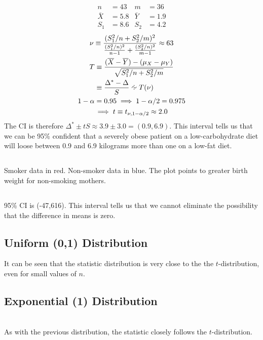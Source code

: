 \documentclass[twocolumn]{article}
\begin{document}
\begin{align*}
n&=43		&	m&=36\\
\bar X&=5.8	&	\bar Y&=1.9\\
S_1&=8.6		&	S_2&=4.2
\end{align*}
\begin{gather*}
\nu\equiv\frac{(S_1^2/n+S_2^2/m)^2}{
	\frac{(S_1^2/n)^2}{n-1}+
	\frac{(S_2^2/n)^2}{m-1}
}\approx 63\\
\begin{aligned}
T
&\equiv\frac{(\bar X-\bar Y)-(\mu_X-\mu_Y)}{\sqrt{S_1^2/n+S_2^2/m}}\\
&\equiv\frac{\Delta^*-\Delta}{S}\asim T(\nu)\\
\end{aligned}\\
1-\alpha=0.95\implies1-\alpha/2=0.975\\
\implies t\equiv t_{\nu,1-\alpha/2}\approx 2.0\\
\end{gather*}
The CI is therefore $\Delta^*\pm tS\approx 3.9\pm 3.0=(0.9,6.9)$. This interval tells us that we can be 95\% confident that a severely obese patient on a low-carbohydrate diet will loose between 0.9 and 6.9 kilograms more than one on a low-fat diet.

\subsection{}
Smoker data in red. Non-smoker data in blue. The plot points to greater birth weight for non-smoking mothers.
\subsection{}
95\% CI is (-47,616). This interval tells us that we cannot eliminate the possibility that the difference in means is zero.


\subsection{Uniform (0,1) Distribution }
\clearpage
{}

It can be seen that the statistic distribution is very close to the the $t$-distribution, even for small values of $n$.

\subsection{Exponential (1) Distribution}
\\
As with the previous distribution, the statistic closely follows the $t$-distribution.
\clearpage
\end{document}

